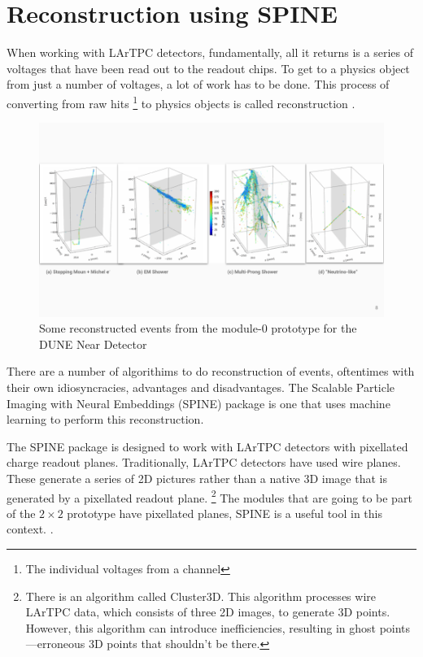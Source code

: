 \section{Reconstruction using SPINE}

When working with LArTPC detectors, fundamentally, all it returns is a series of voltages that have been read out to the  readout chips.
To get to a physics object from just a number of  voltages, a lot of work has to be done.
This process of converting from raw hits
\footnote{The individual voltages from a channel}
to physics objects is called reconstruction \cite{Dominé_deSoux_Drielsma_Koh_Itay_Lin_Terao_Tsang_Usher_2021}.

\begin{figure}[H]
  \centering
  \includegraphics[width=120mm]{figures/mod0Events.png}
  \caption{Some reconstructed events from the module-0 prototype for the DUNE Near Detector}
  \label{mod0Event}
\end{figure}

There are a number of algorithims to do reconstruction of events, oftentimes with their own idiosyncracies, advantages and disadvantages.
The  Scalable Particle Imaging with Neural Embeddings (SPINE) package is one that uses machine learning to perform this reconstruction.

The SPINE  package is designed to work with LArTPC detectors with pixellated charge readout planes.
Traditionally, LArTPC detectors have used wire planes.
These generate a series of 2D pictures rather than  a native 3D image that is generated by a pixellated readout plane.
\footnote{There is an algorithm called  Cluster3D.
  This algorithm processes wire LArTPC data, which consists of three 2D images, to generate 3D points.
  However, this algorithm can introduce inefficiencies, resulting in ghost points—erroneous 3D points that shouldn't be there.}
The modules that are going to be part of the $2 \times 2$  prototype have pixellated planes, SPINE is a useful tool in this context. \cite{drielsma2020clusteringelectromagneticshowersparticle}.

